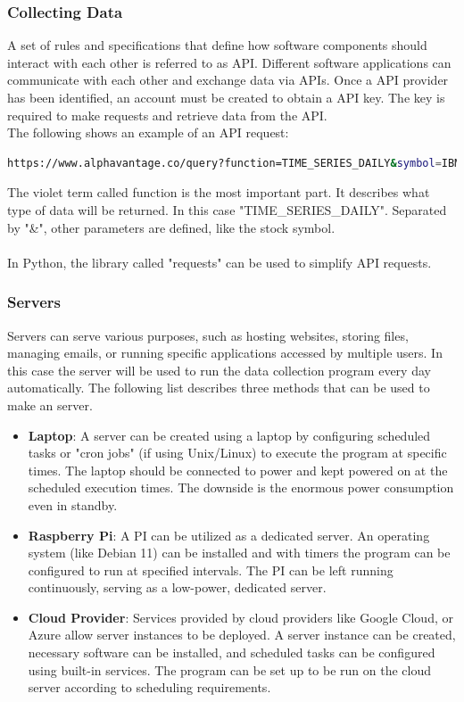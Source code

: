 \subsubsection{Collecting Data}\label{sec: Collecting Data}
A set of rules and specifications that define how software components should interact with each other is referred to as \ac{API}. Different software applications can communicate with each other and exchange data via \ac{API}s. Once a \ac{API} provider has been identified, an account must be created to obtain a \ac{API} key. The key is required to make requests and retrieve data from the \ac{API}.\\
The following shows an example of an \ac{API} request:\\
\begin{lstlisting}[language=bash]
https://www.alphavantage.co/query?function=TIME_SERIES_DAILY&symbol=IBM&apikey=demo
\end{lstlisting}
The violet term called function is the most important part. It describes what type of data will be returned. In this case "TIME\_SERIES\_DAILY". Separated by "\&", other parameters are defined, like the stock symbol.\\
\\
In Python, the library called "requests" can be used to simplify \ac{API} requests.
\subsubsection{Servers}\label{sec: Server}
Servers can serve various purposes, such as hosting websites, storing files, managing emails, or running specific applications accessed by multiple users. In this case the server will be used to run the data collection program every day automatically. The following list describes three methods that can be used to make an server.\\
\begin{itemize}
	\item \textbf{Laptop}: A server can be created using a laptop by configuring scheduled tasks or "cron jobs" (if using Unix/Linux) to execute the program at specific times. The laptop should be connected to power and kept powered on at the scheduled execution times. The downside is the enormous power consumption even in standby.
	\item \textbf{Raspberry Pi}: A \ac{PI} can be utilized as a dedicated server. An operating system (like Debian 11) can be installed and with timers the program can be configured to run at specified intervals. The \ac{PI} can be left running continuously, serving as a low-power, dedicated server.	
	\item \textbf{Cloud Provider}: Services provided by cloud providers like Google Cloud, or Azure allow server instances to be deployed. A server instance can be created, necessary software can be installed, and scheduled tasks can be configured using built-in services. The program can be set up to be run on the cloud server according to scheduling requirements.\\
\end{itemize}
\clearpage
